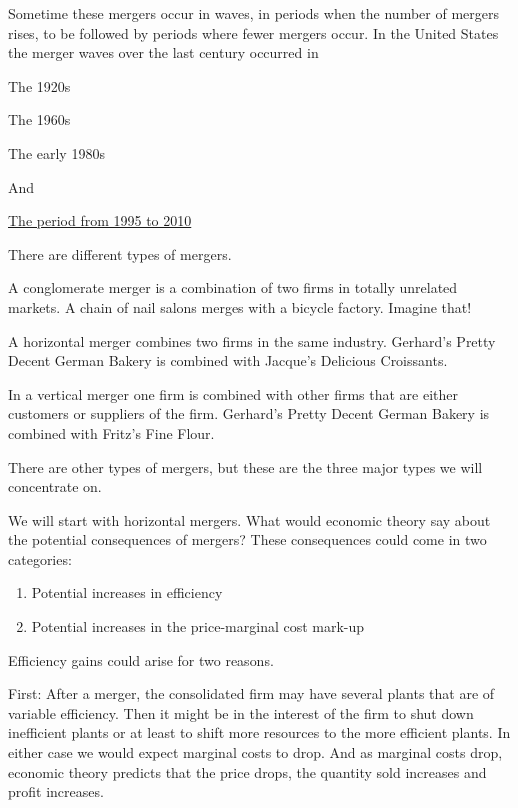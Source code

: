 \documentclass[
]{book}
\providecommand{\tightlist}{%
  \setlength{\itemsep}{0pt}\setlength{\parskip}{0pt}}
\begin{document}
Sometime these mergers occur in waves, in periods when the number of mergers rises, to be followed by periods where fewer mergers occur. In the United States the merger waves over the last century occurred in

\begin{center}
The 1920s

The 1960s

The early 1980s

And

\href{https://amsa-network.com/amsanews/search/2019/1/17/market-basics-merger-waves}{The period from 1995 to 2010}

\end{center}

There are different types of mergers.

A conglomerate merger is a combination of two firms in totally unrelated markets. A chain of nail salons merges with a bicycle factory. Imagine that!

A horizontal merger combines two firms in the same industry. Gerhard's Pretty Decent German Bakery is combined with Jacque's Delicious Croissants.

In a vertical merger one firm is combined with other firms that are either customers or suppliers of the firm. Gerhard's Pretty Decent German Bakery is combined with Fritz's Fine Flour.

There are other types of mergers, but these are the three major types we will concentrate on.

We will start with horizontal mergers. What would economic theory say about the potential consequences of mergers? These consequences could come in two categories:

\begin{enumerate}
\def\labelenumi{\arabic{enumi}.}
\tightlist
\item
  Potential increases in efficiency
\item
  Potential increases in the price-marginal cost mark-up
\end{enumerate}

Efficiency gains could arise for two reasons.

First: After a merger, the consolidated firm may have several plants that are of variable efficiency. Then it might be in the interest of the firm to shut down inefficient plants or at least to shift more resources to the more efficient plants. In either case we would expect marginal costs to drop. And as marginal costs drop, economic theory predicts that the price drops, the
quantity sold increases and profit increases.
\end{document}
